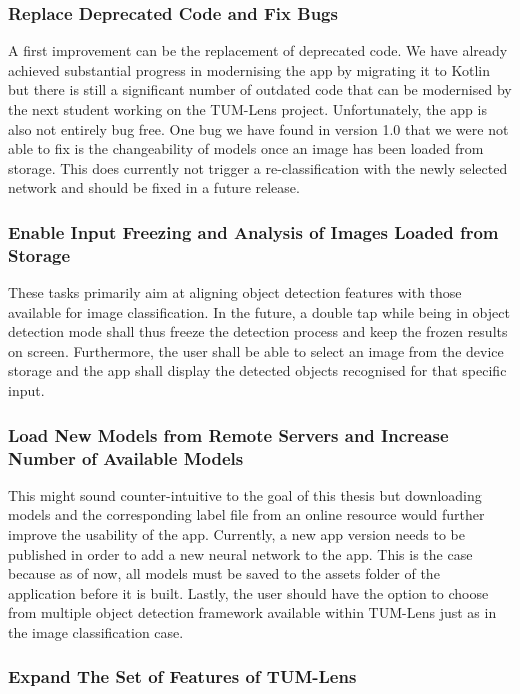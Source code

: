 \documentclass[
			   fontsize=11pt,
               paper=a4,
               bibliography=totoc,
               idxtotoc,
               headsepline,
               footsepline,
               footinclude=false,
               BCOR=12mm,
               DIV=13,
               openany,   %
               ]
               {scrbook}
\begin{document}
\subsubsection{Replace Deprecated Code and Fix Bugs}
A first improvement can be the replacement of deprecated code. We have already achieved substantial progress in modernising the app by migrating it to Kotlin but there is still a significant number of outdated code that can be modernised by the next student working on the TUM-Lens project. Unfortunately, the app is also not entirely bug free. One bug we have found in version 1.0 that we were not able to fix is the changeability of models once an image has been loaded from storage. This does currently not trigger a re-classification with the newly selected network and should be fixed in a future release.

\subsubsection{Enable Input Freezing and Analysis of Images Loaded from Storage}
These tasks primarily aim at aligning object detection features with those available for image classification. In the future, a double tap while being in object detection mode shall thus freeze the detection process and keep the frozen results on screen. Furthermore, the user shall be able to select an image from the device storage and the app shall display the detected objects recognised for that specific input.

\subsubsection{Load New Models from Remote Servers and Increase Number of Available Models}
This might sound counter-intuitive to the goal of this thesis but downloading models and the corresponding label file from an online resource would further improve the usability of the app. Currently, a new app version needs to be published in order to add a new neural network to the app. This is the case because as of now, all models must be saved to the assets folder of the application before it is built. Lastly, the user should have the option to choose from multiple object detection framework available within TUM-Lens just as in the image classification case.

\subsubsection{Expand The Set of Features of TUM-Lens}
\end{document}
